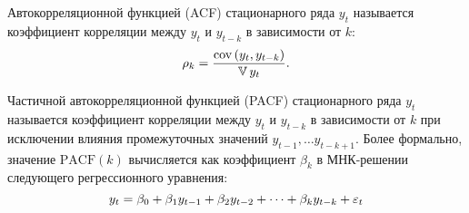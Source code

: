 \begin{definition}
    Автокорреляционной функцией (ACF) стационарного ряда $y_t$ называется коэффициент корреляции между $y_t$ и $y_{t-k}$ в зависимости от $k$:
    \begin{equation*}
        \rho_k = \frac{\operatorname{cov}\left( y_t, y_{t-k} \right)}{\operatorname{\mathbb{V}} y_t}.
    \end{equation*}
\end{definition}

\begin{definition}
    Частичной автокорреляционной функцией (PACF) стационарного ряда $y_t$ называется коэффициент корреляции между $y_t$ и $y_{t-k}$ в зависимости от $k$ при исключении влияния промежуточных значений $y_{t-1}, \dots y_{t-k+1}$. Более формально, значение $\mathrm{PACF}(k)$ вычисляется как коэффициент $\beta_k$ в МНК-решении следующего регрессионного уравнения:
    \begin{equation*}
        y_t = \beta_0 + \beta_1 y_{t-1} + \beta_2 y_{t-2} + \dots + \beta_k y_{t-k} + \varepsilon_t
    \end{equation*}
\end{definition}





















